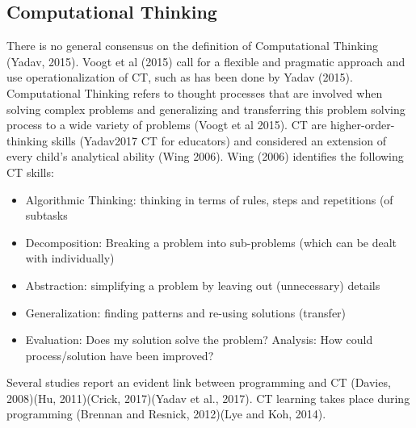 \subsection{Computational Thinking}

There is no general consensus on the definition of Computational Thinking (Yadav, 2015). Voogt et al (2015) call for a flexible and pragmatic approach and use operationalization of CT, such as has been done by Yadav (2015). Computational Thinking refers to thought processes that are involved when solving complex problems and generalizing and transferring this problem solving process to a wide variety of problems (Voogt et al 2015). CT are higher-order-thinking skills  (Yadav2017 CT for educators) and considered an extension of every child's analytical ability (Wing 2006). Wing (2006) identifies the following CT skills:\label{CTdefWing}
\begin{itemize}
\item Algorithmic Thinking: thinking in terms of rules, steps and repetitions (of subtasks
\item Decomposition: Breaking a problem into sub-problems (which can be dealt with individually)
\item Abstraction: simplifying a problem by leaving out (unnecessary) details
\item Generalization: finding patterns and re-using solutions (transfer)
\item Evaluation: Does my solution solve the problem? Analysis: How could process/solution have been improved?
\end{itemize}





Several studies report an evident link between programming and CT (Davies, 2008)(Hu, 2011)(Crick, 2017)(Yadav et al., 2017).
CT learning takes place during programming (Brennan and Resnick, 2012)(Lye and Koh, 2014).




